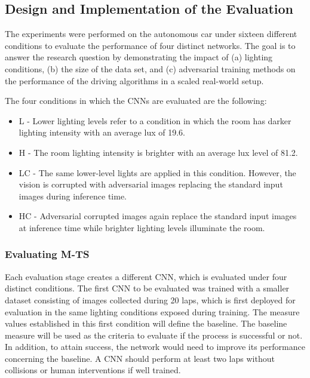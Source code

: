 \documentclass[12pt]{article}
\begin{document}
\subsection{Design and Implementation of the Evaluation}

The experiments were performed on the autonomous car under sixteen different conditions to evaluate the performance of four distinct networks. The goal is to answer the research question by demonstrating the impact of (a) lighting conditions, (b) the size of the data set, and (c) adversarial training methods on the performance of the driving algorithms in a scaled real-world setup.

The four conditions in which the CNNs are evaluated are the following:


\begin{itemize}

   \item L - Lower lighting levels refer to a condition in which the room has darker lighting intensity with an average lux of 19.6.
   
    \item H - The room lighting intensity is brighter with an average lux level of 81.2. 
   
    \item LC - The same lower-level lights are applied in this condition. However, the vision is corrupted with adversarial images replacing the standard input images during inference time.
   
   \item HC - Adversarial corrupted images again replace the standard input images at inference time while brighter lighting levels illuminate the room.
\end{itemize}

\subsubsection{Evaluating M-TS}

Each evaluation stage creates a different CNN, which is evaluated under four distinct conditions. The first CNN to be evaluated was trained with a smaller dataset consisting of images collected during 20 laps, which is first deployed for evaluation in the same lighting conditions exposed during training. The measure values established in this first condition will define the baseline. The baseline measure will be used as the criteria to evaluate if the process is successful or not. In addition, to attain success, the network would need to improve its performance concerning the baseline. A CNN should perform at least two laps without collisions or human interventions if well trained. 
\end{document}
